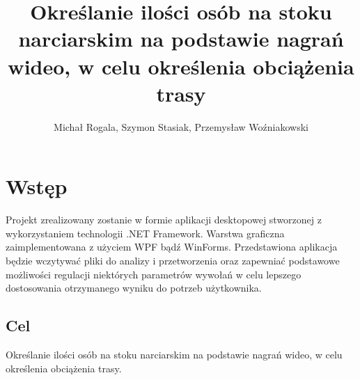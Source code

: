 \documentclass[a4paper]{article}
\title{Określanie ilości osób na stoku narciarskim na podstawie nagrań wideo, w celu określenia obciążenia trasy}
\date{}
\author{Michał Rogala, Szymon Stasiak, Przemysław Woźniakowski}
\begin{document}
  \maketitle

\section{Wstęp}
Projekt zrealizowany zostanie w formie aplikacji desktopowej stworzonej z wykorzystaniem technologii .NET Framework. Warstwa graficzna zaimplementowana z użyciem WPF bądź WinForms.
Przedstawiona aplikacja będzie wczytywać pliki do analizy i przetworzenia oraz zapewniać podstawowe możliwości regulacji niektórych parametrów wywołań w celu lepszego dostosowania otrzymanego wyniku do potrzeb użytkownika.

\subsection{Cel}
Określanie ilości osób na stoku narciarskim na podstawie nagrań wideo, w celu określenia obciążenia trasy.
\end{document}
